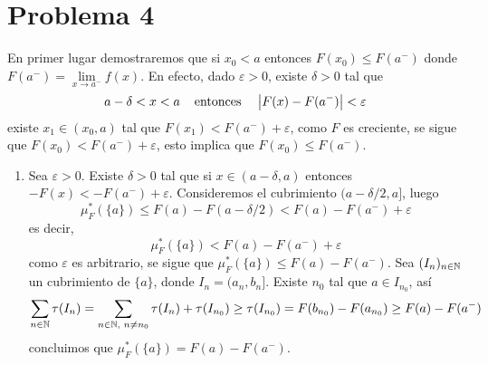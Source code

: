 \documentclass{article}
\begin{document}
\section*{Problema 4}
\noindent En primer lugar demostraremos que si $x_{0}<a$ entonces $F(x_{0})\leq F(a^{-})$ donde 
$F(a^{-})=\lim\limits_{x\to a^{-}}f(x)$. En efecto, dado $\varepsilon>0$, existe $\delta>0$ tal que
\begin{equation*}
    a-\delta<x<a\hspace{4mm}\text{entonces}\hspace{4mm}\left|F(x)-F(a^{-}) \right|<\varepsilon
\end{equation*}
existe $x_{1}\in(x_{0},a)$ tal que $F(x_{1})<F(a^{-})+\varepsilon$, como $F$ es creciente, 
se sigue que $F(x_{0})<F(a^{-})+\varepsilon$, esto implica que $F(x_{0})\leq F(a^{-})$.
\begin{enumerate}
    \item Sea $\varepsilon>0$. Existe $\delta>0$ tal que si $x\in(a-\delta,a)$ entonces 
    $-F(x)<-F(a^{-})+\varepsilon$. Consideremos el cubrimiento $(a-\delta/2,a]$, luego
    \begin{equation*}
        \mu_{F}^{*}(\{a\})\leq F(a)-F(a-\delta/2)<F(a)-F(a^{-})+\varepsilon
    \end{equation*}
    es decir,
    \begin{equation*}
        \mu_{F}^{*}(\{a\})<F(a)-F(a^{-})+\varepsilon
    \end{equation*}
    como $\varepsilon$ es arbitrario, se sigue que $\mu_{F}^{*}(\{a\})\leq F(a)-F(a^{-})$. Sea
    $(I_{n})_{n\in\mathbb{N}}$ un cubrimiento de $\{a\}$, donde $I_{n}=(a_{n},b_{n}]$. Existe $n_{0}$ 
    tal que $a\in I_{n_{0}}$, así
    \begin{equation*}
        \sum_{n\in\mathbb{N}}\tau(I_{n})=\sum_{n\in\mathbb{N},\hspace{1mm}n\neq n_{0}}\tau(I_{n})+\tau(I_{n_{0}})
        \geq\tau(I_{n_{0}})=F(b_{n_{0}})-F(a_{n_{0}})\geq F(a)-F(a^{-})
    \end{equation*}
    concluimos que $\mu_{F}^{*}(\{a\})=F(a)-F(a^{-})$.


\end{enumerate}
\end{document}
